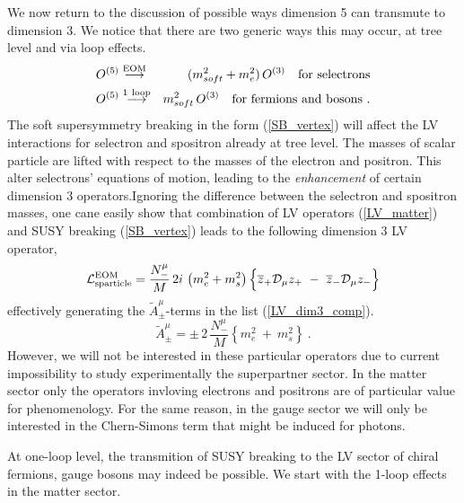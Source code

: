 \documentclass[12pt]{revtex4}
\begin{document}
We now return to the discussion of possible ways dimension 5 
can transmute to dimension 3. We notice that there are two generic ways this 
may occur, at tree level and via loop effects.
\begin{eqnarray*}
\nonumber
O^{(5)} & \stackrel{\mathrm {EOM}}{\longrightarrow} &
  (m_{soft}^2 + m_e^2)\, O^{(3)}~~~{\rm for~selectrons}\\
\nonumber
O^{(5)} & \stackrel{\mathrm {1\ loop}}{\longrightarrow} &
  m_{soft}^2\, O^{(3)} ~~~{\rm for~fermions ~and ~bosons}
~.
\end{eqnarray*}
The soft supersymmetry
breaking in the form (\ref{SB_vertex}) will affect the
LV interactions for selectron and spositron already at tree level.
The  masses of scalar particle are lifted with
respect to the masses of the electron and positron. 
This alter selectrons' equations of motion, leading to the 
{\em enhancement} of certain dimension 3 operators.Ignoring 
the difference between the selectron and spositron
masses, one cane easily show that combination of LV operators (\ref{LV_matter}) and 
SUSY breaking (\ref{SB_vertex}) leads to the following dimension 3 LV operator,
\begin{equation}
  \mathcal{L}_{\rm sparticle}^{\rm EOM} = 
\frac{N_-^\mu}{M}\, 2 i\, 
\left(
m_e^2 + m_s^2
\right)
\Bigl\{ 
\overline{z}_+ \mathcal{D}_\mu z_+ 
~-~
\overline{z}_- \mathcal{D}_\mu z_- 
\Bigr\}
\end{equation}
effectively  generating the $ \widetilde{A}^\mu_\pm $-terms in 
the list (\ref{LV_dim3_comp}). \begin{equation}
\widetilde{A}_\pm^\mu = 
\pm\, 2\, \frac{N_-^\mu}
                        { M }   
\left\{
m_e^2 ~+~ m_s^2
\right\}~.
\end{equation}
However, we will not be interested in these particular operators 
due to current impossibility to study experimentally  the superpartner sector. 
In the matter sector only the operators invloving electrons and positrons are 
     of particular value for phenomenology.  
For the same reason, in the gauge sector we will only be interested
in the Chern-Simons term that might be induced for photons.

At one-loop level, the transmition 
of SUSY breaking to the LV sector of chiral fermions, gauge bosons may indeed
be possible. We start with the 1-loop effects in the matter sector.
\end{document}
